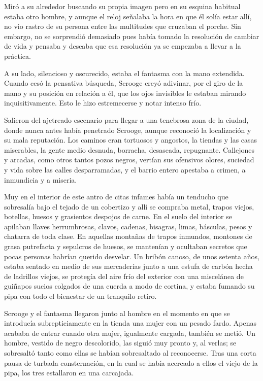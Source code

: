 \documentclass{novela}
\begin{document}
 Miró a su alrededor buscando su propia imagen pero en su esquina habitual estaba otro hombre, y aunque el reloj señalaba la hora en que él solía estar allí, no vio rastro de su persona entre las multitudes que cruzaban el porche. Sin embargo, no se sorprendió demasiado pues había tomado la resolución de cambiar de vida y pensaba y deseaba que esa resolución ya se empezaba a llevar a la práctica.

 A su lado, silencioso y oscurecido, estaba el fantasma con la mano extendida. Cuando cesó la pensativa búsqueda, Scrooge creyó adivinar, por el giro de la mano y su posición en relación a él, que los ojos invisibles le estaban mirando inquisitivamente. Esto le hizo estremecerse y notar intenso frío.

 Salieron del ajetreado escenario para llegar a una tenebrosa zona de la ciudad, donde nunca antes había penetrado Scrooge, aunque reconoció la localización y su mala reputación. Los caminos eran tortuosos y angostos, la tiendas y las casas miserables, la gente medio desnuda, borracha, desaseada, repugnante. Callejones y arcadas, como otros tantos pozos negros, vertían sus ofensivos olores, suciedad y vida sobre las calles desparramadas, y el barrio entero apestaba a crimen, a inmundicia y a miseria.

 Muy en el interior de este antro de citas infames había un tenducho que sobresalía bajo el tejado de un cobertizo y allí se compraba metal, trapos viejos, botellas, huesos y grasientos despojos de carne. En el suelo del interior se apilaban llaves herrumbrosas, clavos, cadenas, bisagras, limas, básculas, pesos y chatarra de toda clase. En aquellas montañas de trapos inmundos, montones de grasa putrefacta y sepulcros de huesos, se mantenían y ocultaban secretos que pocas personas habrían querido desvelar. Un bribón canoso, de unos setenta años, estaba sentado en medio de sus mercaderías junto a una estufa de carbón hecha de ladrillos viejos, se protegía del aire frío del exterior con una miscelánea de guiñapos sucios colgados de una cuerda a modo de cortina, y estaba fumando su pipa con todo el bienestar de un tranquilo retiro.

 Scrooge y el fantasma llegaron junto al hombre en el momento en que se introducía subrepticiamente en la tienda una mujer con un pesado fardo. Apenas acababa de entrar cuando otra mujer, igualmente cargada, también se metió. Un hombre, vestido de negro descolorido, las siguió muy pronto y, al verlas; se sobresaltó tanto como ellas se habían sobresaltado al reconocerse. Tras una corta pausa de turbada consternación, en la cual se había acercado a ellos el viejo de la pipa, los tres estallaron en una carcajada.
\end{document}
